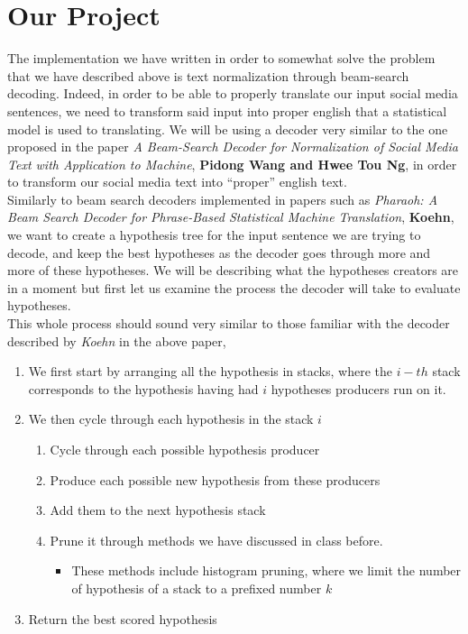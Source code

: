 \documentclass{article}
\begin{document}
\section{Our Project}

The implementation we have written in order to somewhat solve the problem that we have described above is text normalization through beam-search decoding. Indeed, in order to be able to properly translate our input social media sentences, we need to transform said input into proper english that a statistical model is used to translating. We will be using a decoder very similar to the one proposed in the paper  \textit{A Beam-Search Decoder for Normalization of Social Media Text with Application to Machine}, \textbf{Pidong Wang and Hwee Tou Ng}, in order to transform our social media text into “proper” english text. \\

Similarly to beam search decoders implemented in papers such as \textit{Pharaoh: A Beam Search Decoder for Phrase-Based Statistical Machine Translation}, \textbf{Koehn}, we want to create a hypothesis tree for the input sentence we are trying to decode, and keep the best hypotheses as the decoder goes through more and more of these hypotheses. We will be describing what the hypotheses creators are in a moment but first let us examine the process the decoder will take to evaluate hypotheses. \\

This whole process should sound very similar to those familiar with the decoder described by \textit{Koehn} in the above paper, 
\begin{enumerate}
	\item We first start by arranging all the hypothesis in stacks, where the $i-th$ stack corresponds to the hypothesis having had $i$ hypotheses producers run on it. 
	\item We then cycle through each hypothesis in the stack $i$
	\begin{enumerate}
		\item Cycle through each possible hypothesis producer
		\item Produce each possible new hypothesis from these producers
		\item Add them to the next hypothesis stack 
		\item Prune it through methods we have discussed in class before.
		\begin{itemize}
			\item These methods include histogram pruning, where we limit the number of hypothesis of a stack to a prefixed number $k$
		\end{itemize}
	\end{enumerate}
	\item Return the best scored hypothesis
\end{enumerate}
\end{document}

